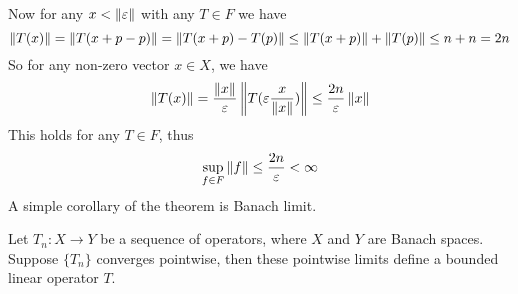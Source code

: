 Now for any $x<\left\|{\varepsilon}\right\|$ with any $T\in F$ we have
$$
	\left\|{T(x)}\right\|=\left\|{T(x+p-p)}\right\|=\left\|{T(x+p)-T(p)}\right\|\leq\left\|{T(x+p)}\right\|+\left\|{T(p)}\right\|\leq n+n=2n
$$
So for any non-zero vector $x\in X$, we have
$$
	\left\|{T(x)}\right\|=\frac{\left\|{x}\right\|}{\varepsilon}\left\|{T(\varepsilon \frac{x}{\left\|{x}\right\|})}\right\|\leq\frac{2n}{\varepsilon}\left\|{x}\right\|
$$
This holds for any $T\in F$, thus
$$
	\sup_{f\in F}\left\|{f}\right\|\leq\frac{2n}{\varepsilon}<\infty
$$
A simple corollary of the theorem is Banach limit.
\begin{corollary}\rm
	Let $T_n:X\xrightarrow{}Y$ be a sequence of operators, where $X$ and $Y$ are Banach spaces. Suppose $\{T_n\}$ converges pointwise,
	then these pointwise limits define a bounded linear operator $T$.
\end{corollary}